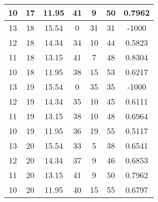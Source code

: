 \documentclass[letterpaper, 12pt]{article}
\begin{document}
\begin{longtable}{|c|c|c|c|c|c|c|}
10 & 17 & 11.95 & 41 & 9 & 50 & 0.7962 \\
\hline
13 & 18 & 15.54 & 0 & 31 & 31 & -1000 \\
\hline
12 & 18 & 14.34 & 34 & 10 & 44 & 0.5823 \\
\hline
11 & 18 & 13.15 & 41 & 7 & 48 & 0.8304 \\
\hline
10 & 18 & 11.95 & 38 & 15 & 53 & 0.6217 \\
\hline
13 & 19 & 15.54 & 0 & 35 & 35 & -1000 \\
\hline
12 & 19 & 14.34 & 35 & 10 & 45 & 0.6111 \\
\hline
11 & 19 & 13.15 & 38 & 10 & 48 & 0.6964 \\
\hline
10 & 19 & 11.95 & 36 & 19 & 55 & 0.5117 \\
\hline
13 & 20 & 15.54 & 33 & 5 & 38 & 0.6541 \\
\hline
12 & 20 & 14.34 & 37 & 9 & 46 & 0.6853 \\
\hline
11 & 20 & 13.15 & 41 & 9 & 50 & 0.7962 \\
\hline
10 & 20 & 11.95 & 40 & 15 & 55 & 0.6797 \\
\hline
\end{longtable}
\end{document}
